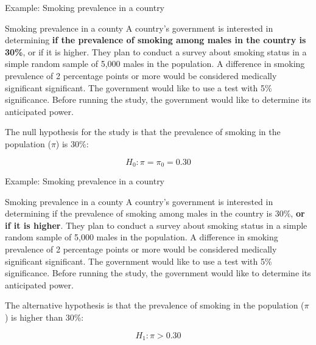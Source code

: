 \documentclass[ignorenonframetext,]{beamer}
\begin{document}
\begin{frame}{Example: Smoking prevalence in a country}

\begin{block}{Smoking prevalence in a county}
A country's government is interested in determining \textbf{if the prevalence of smoking among males in the country is 30\%}, or if it is higher. They plan to conduct a survey about smoking status in a simple random sample of 5,000 males in the population. A difference in smoking prevalence of 2 percentage points or more would be considered medically significant significant. The government would like to use a test with 5\% significance. Before running the study, the government would like to determine its anticipated power.
\end{block}

The null hypothesis for the study is that the prevalence of smoking in
the population (\(\pi\)) is 30\%:

\[
H_0 : \pi = \pi_0 = 0.30
\]

\end{frame}

\begin{frame}{Example: Smoking prevalence in a country}

\begin{block}{Smoking prevalence in a county}
A country's government is interested in determining if the prevalence of smoking among males in the country is 30\%, \textbf{or if it is higher}. They plan to conduct a survey about smoking status in a simple random sample of 5,000 males in the population. A difference in smoking prevalence of 2 percentage points or more would be considered medically significant significant. The government would like to use a test with 5\% significance. Before running the study, the government would like to determine its anticipated power.
\end{block}

The alternative hypothesis is that the prevalence of smoking in the
population (\(\pi\)) is higher than 30\%:

\[
H_1 : \pi > 0.30
\]

\end{frame}
\end{document}

